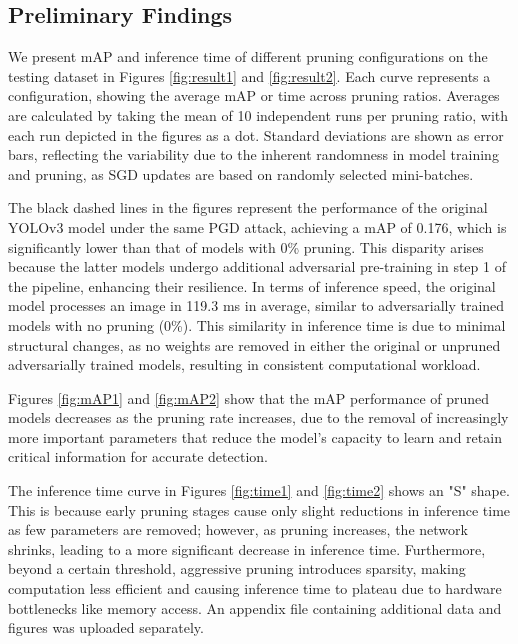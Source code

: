 \documentclass[10pt]{cai}
\begin{document}
\subsection{Preliminary Findings}
We present mAP and inference time of different pruning configurations on the testing dataset in Figures \ref{fig:result1} and \ref{fig:result2}. Each curve represents a configuration, showing the average mAP or time across pruning ratios. Averages are calculated by taking the mean of 10 independent runs per pruning ratio, with each run depicted in the figures as a dot. Standard deviations are shown as error bars, reflecting the variability due to the inherent randomness in model training and pruning, as SGD updates are based on randomly selected mini-batches.

The black dashed lines in the figures represent the performance of the original YOLOv3 model under the same PGD attack, achieving a mAP of 0.176, which is significantly lower than that of models with 0\% pruning. This disparity arises because the latter models undergo additional adversarial pre-training in step 1 of the pipeline, enhancing their resilience. In terms of inference speed, the original model processes an image in 119.3 ms in average, similar to adversarially trained models with no pruning (0\%). This similarity in inference time is due to minimal structural changes, as no weights are removed in either the original or unpruned adversarially trained models, resulting in consistent computational workload.

Figures \ref{fig:mAP1} and \ref{fig:mAP2} show that the mAP performance of pruned models decreases as the pruning rate increases, due to the removal of increasingly more important parameters that reduce the model's capacity to learn and retain critical information for accurate detection. 

The inference time curve in Figures \ref{fig:time1} and \ref{fig:time2} shows an "S" shape. This is because early pruning stages cause only slight reductions in inference time as few parameters are removed; however, as pruning increases, the network shrinks, leading to a more significant decrease in inference time. Furthermore, beyond a certain threshold, aggressive pruning introduces sparsity, making computation less efficient and causing inference time to plateau due to hardware bottlenecks like memory access. An appendix file containing additional data and figures was uploaded separately.
\end{document}
